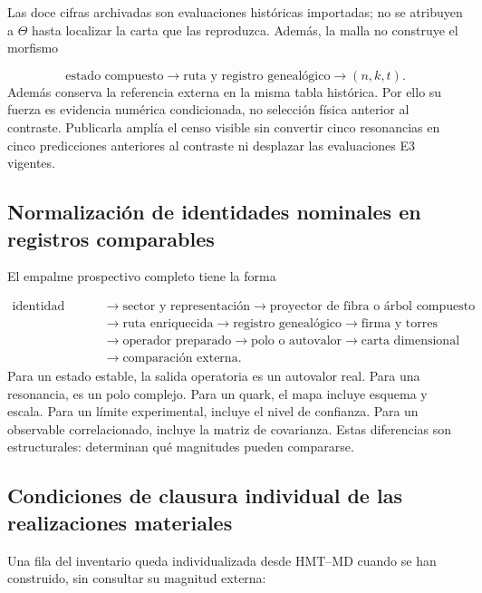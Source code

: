 \endgroup
Las doce cifras archivadas son evaluaciones históricas importadas; no se atribuyen a \(\Theta\) hasta localizar la carta que las reproduzca. Además, la malla no construye el morfismo

\[
\text{estado compuesto}
\longrightarrow\text{ruta y registro genealógico}
\longrightarrow(n,k,t).
\]
Además conserva la referencia externa en la misma tabla histórica. Por ello su fuerza es evidencia numérica condicionada, no selección física anterior al contraste. Publicarla amplía el censo visible sin convertir cinco resonancias en cinco predicciones anteriores al contraste ni desplazar las evaluaciones E3 vigentes.
\fi

\subsection{Normalización de identidades nominales en registros comparables}
El empalme prospectivo completo tiene la forma

\[
\begin{aligned}
\text{identidad física}
&\longrightarrow
\text{sector y representación}
\longrightarrow
\text{proyector de fibra o árbol compuesto}\\
&\longrightarrow
\text{ruta enriquecida}
\longrightarrow
\text{registro genealógico}
\longrightarrow
\text{firma y torres}\\
&\longrightarrow
\text{operador preparado}
\longrightarrow
\text{polo o autovalor}
\longrightarrow
\text{carta dimensional}\\
&\longrightarrow
\text{comparación externa}.
\end{aligned}
\]
Para un estado estable, la salida operatoria es un autovalor real. Para una resonancia, es un polo complejo. Para un quark, el mapa incluye esquema y escala. Para un límite experimental, incluye el nivel de confianza. Para un observable correlacionado, incluye la matriz de covarianza. Estas diferencias son estructurales: determinan qué magnitudes pueden compararse.

\subsection{Condiciones de clausura individual de las realizaciones materiales}
Una fila del inventario queda individualizada desde HMT--MD cuando se han construido, sin consultar su magnitud externa:

